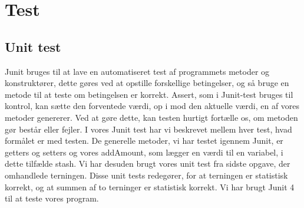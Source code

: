 \chapter{Test}

\section{Unit test}
Junit bruges til at lave en automatiseret test af programmets metoder og konstruktører, dette gøres ved at opstille forskellige betingelser, og så bruge en metode til at teste om betingelsen er korrekt. 
Assert, som i Junit-test bruges til kontrol, kan sætte den forventede værdi, op i mod den aktuelle værdi, en af vores metoder genererer. 
Ved at gøre dette, kan testen hurtigt fortælle os, om metoden gør består eller fejler. 
I vores Junit test har vi beskrevet mellem hver test, hvad formålet er med testen. 
De generelle metoder, vi har testet igennem Junit, er getters og setters og vores addAmount, som lægger en værdi til en variabel, i dette tilfælde stash. Vi har desuden brugt vores unit test fra sidste opgave, der omhandlede terningen. Disse unit tests redegører, for at terningen er statistisk korrekt, og at summen af to terninger er statistisk korrekt. Vi har brugt Junit 4 til at teste vores program.

